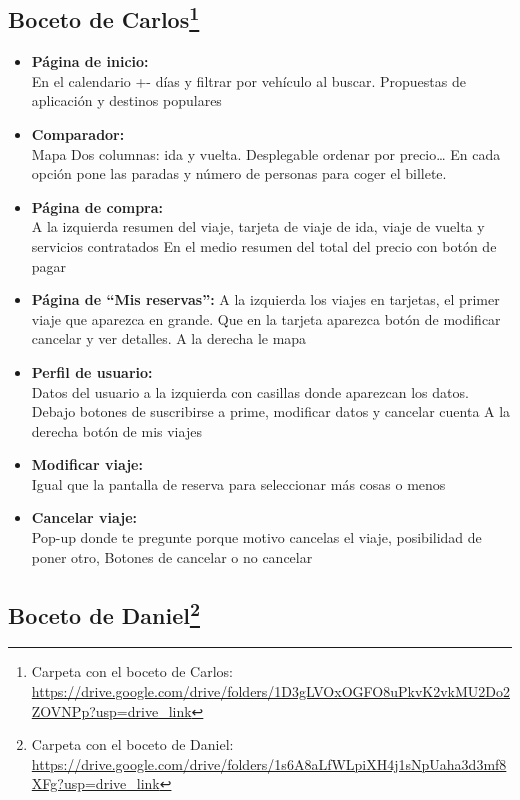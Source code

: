 \subsection[Boceto de Carlos]{Boceto de Carlos\footnote{Carpeta con el boceto de Carlos: \url{https://drive.google.com/drive/folders/1D3gLVOxOGFO8uPkvK2vkMU2Do2ZOVNPp?usp=drive_link}}}

\begin{itemize}
    \item\textbf{Página de inicio:} \\ En el calendario +- días y filtrar por vehículo al buscar.
    Propuestas de aplicación y destinos populares
    
    \item\textbf{Comparador:} \\ Mapa 
    Dos columnas: ida y vuelta.
    Desplegable ordenar por precio…
    En cada opción pone las paradas y número de personas para coger el billete.
    
    \item\textbf{Página de compra:} \\ A la izquierda resumen del viaje, tarjeta de viaje de ida, viaje de vuelta y servicios contratados
    En el medio resumen del total del precio con botón de pagar

    \item\textbf{Página de ``Mis reservas'':} A la izquierda los viajes en tarjetas, el primer viaje que aparezca en grande.
    Que en la tarjeta aparezca botón de modificar cancelar y ver detalles.
    A la derecha le mapa 
    
    \item\textbf{Perfil de usuario:} \\ Datos del usuario a la izquierda con casillas donde aparezcan los datos. 
    Debajo botones de suscribirse a prime, modificar datos y cancelar cuenta
    A la derecha botón de mis viajes

    \item\textbf{Modificar viaje:} \\ Igual que la pantalla de reserva para seleccionar más cosas o menos
    \item\textbf{Cancelar viaje:} \\ Pop-up donde te pregunte porque motivo cancelas el viaje, posibilidad de poner otro,
    Botones de cancelar o no cancelar
    
\end{itemize}
\subsection[Boceto de Daniel]{Boceto de Daniel\footnote{Carpeta con el boceto de Daniel: \url{https://drive.google.com/drive/folders/1s6A8aLfWLpiXH4j1sNpUaha3d3mf8XFg?usp=drive_link}}}


